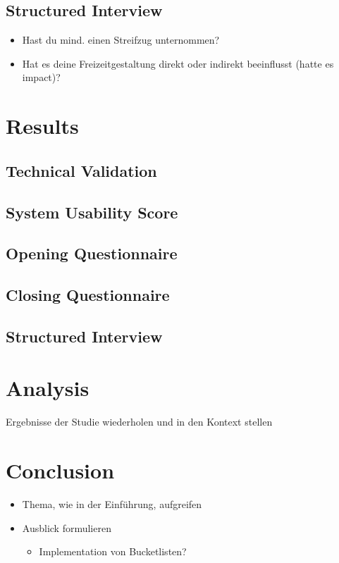 \documentclass[12pt,numbers=noenddot,parskip,bibliography=totocnumbered,listof=totocnumbered,draft=true]{scrreprt}
\begin{document}
\section{Structured Interview}
\begin{itemize} 
	\item Hast du mind. einen Streifzug unternommen?
	\item Hat es deine Freizeitgestaltung direkt oder indirekt beeinflusst (hatte es impact)?
\end{itemize}

\chapter{Results}

\section{Technical Validation}

\section{System Usability Score}

\section{Opening Questionnaire}

\section{Closing Questionnaire}

\section{Structured Interview}

\chapter{Analysis}
Ergebnisse der Studie wiederholen und in den Kontext stellen

\chapter{Conclusion}
\begin{itemize} 
	\item Thema, wie in der Einführung, aufgreifen
	\item Ausblick formulieren
	\begin{itemize} 
		\item Implementation von Bucketlisten?
	\end{itemize} 
\end{itemize} 
\end{document}
